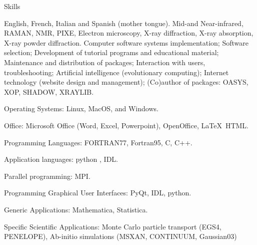 \prefix{}
\begin{rubric}{Skills}


\entry*[Languages]
	English, French, Italian and Spanish (mother tongue).
	 Mid-and Near-infrared, RAMAN, NMR, PIXE, Electron microscopy, X-ray diffraction, X-ray absorption, X-ray powder diffraction.
Computer software systems implementation; Software selection; Development of tutorial programs and educational material; Maintenance and distribution of packages; Interaction with users, troubleshooting; Artificial intelligence (evolutionary computing); Internet technology (website design and management); (Co)author of packages: OASYS, XOP, SHADOW, XRAYLIB.


Operating Systems: Linux, MacOS, and Windows.

Office: Microsoft Office (Word, Excel, Powerpoint), OpenOffice, \LaTeX\, HTML.  

Programming Languages: FORTRAN77, Fortran95, C, C++.

Application languages: python , IDL.

Parallel programming: MPI.

Programming Graphical User Interfaces: PyQt, IDL, python.

Generic Applications: Mathematica, Statistica.

Specific Scientific Applications: Monte Carlo particle transport (EGS4, PENELOPE), Ab-initio simulations (MSXAN, CONTINUUM, Gaussian03)

\end{rubric}
